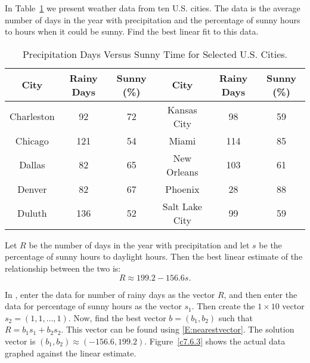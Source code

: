 \documentclass{ximera}
\begin{document}
\begin{computerExercise} \label{c7.6.3}
In Table~\ref{T:sunny} we present weather data from ten U.S. cities.  The
data is the average number of days in the year with precipitation and the
percentage of sunny hours to hours when it could be sunny.  Find the best
linear fit to this data.
\begin{table}[htb]
\begin{center}
\begin{tabular}{|c||c|c||c||c|c|}
\hline
City & Rainy Days & Sunny (\%) & City & Rainy Days & Sunny (\%)\\
\hline
Charleston 	&   92 & 72 & Kansas City 	&   98 & 59\\
Chicago 	&  121 & 54 & Miami 		&  114 & 85 \\
Dallas 		&   82 & 65 & New Orleans 	&  103 & 61 \\
Denver 		&   82 & 67 & Phoenix 		&   28 & 88 \\
Duluth 		&  136 & 52 & Salt Lake City 	&   99 & 59 \\
\hline
\end{tabular}
\caption{Precipitation Days Versus Sunny Time for Selected U.S. Cities.}
\label{T:sunny}
\end{center}
\end{table}

\begin{solution}

\ans Let $R$ be the number of days in the year with precipitation and
let $s$ be the percentage of sunny hours to daylight hours.  Then the
best linear estimate of the relationship between the two is:
\[ R \approx 199.2 - 156.6s. \]

\soln In \Matlabp, enter the data for number of rainy days as the vector
$R$, and then enter the data for percentage of sunny hours as the vector
$s_1$.  Then create the $1 \times 10$ vector $s_2 = (1,1,\dots,1)$.  Now,
find the best vector $b = (b_1,b_2)$ such that $R = b_1s_1 + b_2s_2$. 
This vector can be found using \eqref{E:nearestvector}.  The solution vector
is $(b_1,b_2) \approx (-156.6,199.2)$.  Figure~\ref{c7.6.3} shows the
actual data graphed against the linear estimate.

\begin{figure}[htb]
		\centerline{%
		}
\end{figure}



\end{solution}
\end{computerExercise}
\end{document}
